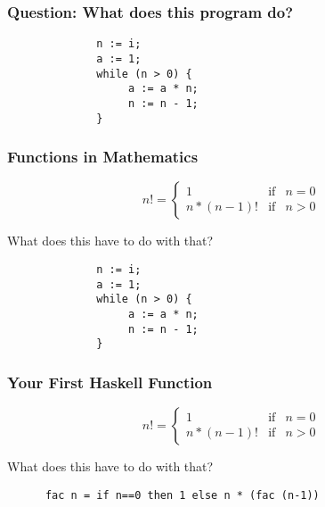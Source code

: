 \documentclass{beamer}
\begin{document}
\begin{frame}[fragile]
    \frametitle{Question: What does this program do? }
    


\begin{verbatim}
              n := i; 
              a := 1; 
              while (n > 0) { 
                   a := a * n; 
                   n := n - 1; 
              }
\end{verbatim}

\end{frame}

\begin{frame}[fragile]
    \frametitle{Functions in Mathematics}
    

\begin{displaymath}
n! = \left\{
     \begin{array}{lcl}
     1 &\mbox{if} & n=0
\\
     n * (n-1)!&\mbox{if} & n > 0
     \end{array}\right.
\end{displaymath}
\pause

What does this have to do with that? 
\begin{verbatim}
              n := i; 
              a := 1; 
              while (n > 0) { 
                   a := a * n; 
                   n := n - 1; 
              }
\end{verbatim}

\end{frame}

\begin{frame}[fragile]
    \frametitle{Your First Haskell Function}
    

\begin{displaymath}
n! = \left\{
     \begin{array}{lcl}
     1 &\mbox{if} & n=0
\\
     n * (n-1)!&\mbox{if} & n > 0
     \end{array}\right.
\end{displaymath}
\pause

What does this have to do with that? 
\begin{verbatim}
      fac n = if n==0 then 1 else n * (fac (n-1))
\end{verbatim}

\end{frame}
\end{document}
